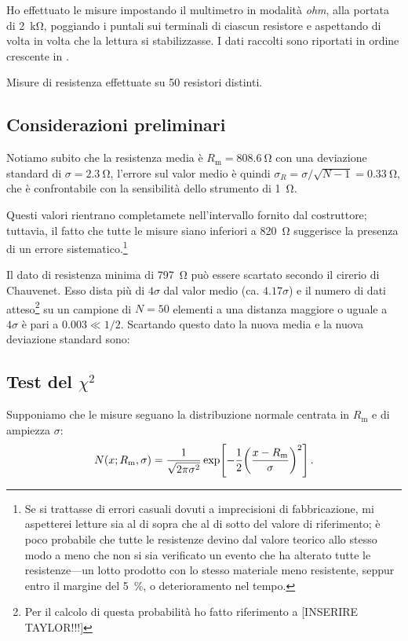         Ho effettuato le misure impostando il multimetro in modalità \emph{ohm}, alla portata di \SI{2}{\kilo\ohm}, poggiando i puntali sui terminali di ciascun resistore e aspettando di volta in volta che la lettura si stabilizzasse. I dati raccolti sono riportati in ordine crescente in .
        \begin{table}
            \centering
            
            \caption{Misure di resistenza effettuate su \num{50} resistori distinti.}
            \label{tab:mul:resistori}
        \end{table}

        \subsection{Considerazioni preliminari}
            Notiamo subito che la resistenza media è $R_\text{m} = \SI{808.6}{\ohm}$ con una deviazione standard di $\sigma = \SI{2.3}{\ohm}$, l'errore sul valor medio è quindi $\sigma_R = \sigma / \sqrt{N-1} = \SI{0.33}{\ohm}$, che è confrontabile con la sensibilità dello strumento di \SI{1}{\ohm}.
            
            Questi valori rientrano completamete nell'intervallo fornito dal costruttore; tuttavia, il fatto che tutte le misure siano inferiori a \SI{820}{\ohm} suggerisce la presenza di un errore sistematico.\footnote{Se si trattasse di errori casuali dovuti a imprecisioni di fabbricazione, mi aspetterei letture sia al di sopra che al di sotto del valore di riferimento; è poco probabile che tutte le resistenze devino dal valore teorico allo stesso modo a meno che non si sia verificato un evento che ha alterato tutte le resistenze---un lotto prodotto con lo stesso materiale meno resistente, seppur entro il margine del \SI{5}{\%}, o deterioramento nel tempo.}

            Il dato di resistenza minima di \SI{797}{\ohm} può essere scartato secondo il cirerio di Chauvenet. Esso dista più di $4\sigma$ dal valor medio (ca. $\num{4.17}\sigma$) e il numero di dati atteso\footnote{Per il calcolo di questa probabilità ho fatto riferimento a [INSERIRE TAYLOR!!!]} su un campione di $N = 50$ elementi a una distanza maggiore o uguale a $4\sigma$ è pari a $\num{0.003} \ll 1/2$. Scartando questo dato la nuova media e la nuova deviazione standard sono:

        \subsection{Test del $\chi^2$}
            Supponiamo che le misure seguano la distribuzione normale centrata in $R_\text{m}$ e di ampiezza $\sigma$:
            \begin{equation*}
                N\pqty{x; R_\text{m}, \sigma}
                = \frac{1}{\sqrt{2\pi\sigma^2}} \exp[ -\frac{1}{2}\pqty{\frac{x - R_\text{m}}{\sigma}}^2]
                \myperiod
            \end{equation*}
            
